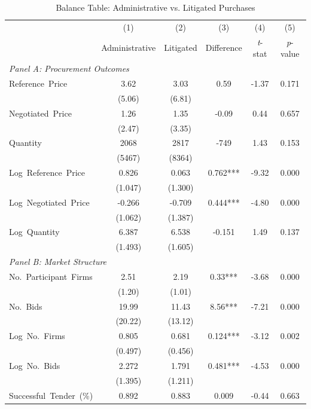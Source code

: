 \begin{table}[ht]
  \centering
  \caption{Balance Table: Administrative vs. Litigated Purchases}
  \label{tab:balance}
  \small
  \begin{threeparttable}
  \begin{tabular}{lccccc}
    \hline\hline
    & (1) & (2) & (3) & (4) & (5) \\
    & Administrative & Litigated & Difference & \textit{t}-stat & \textit{p}-value \\
    \hline
    \multicolumn{6}{l}{\textit{Panel A: Procurement Outcomes}} \\[3pt]
    Reference~Price & 3.62 & 3.03 & 0.59 & -1.37 & 0.171 \\
    & (5.06) & (6.81) & & & \\[3pt]
    Negotiated~Price & 1.26 & 1.35 & -0.09 & 0.44 & 0.657 \\
    & (2.47) & (3.35) & & & \\[3pt]
    Quantity & 2068 & 2817 & -749 & 1.43 & 0.153 \\
    & (5467) & (8364) & & & \\[3pt]
    Log~Reference~Price & 0.826 & 0.063 & 0.762*** & -9.32 & 0.000 \\
    & (1.047) & (1.300) & & & \\[3pt]
    Log~Negotiated~Price & -0.266 & -0.709 & 0.444*** & -4.80 & 0.000 \\
    & (1.062) & (1.387) & & & \\[3pt]
    Log~Quantity & 6.387 & 6.538 & -0.151 & 1.49 & 0.137 \\
    & (1.493) & (1.605) & & & \\[3pt]
    \hline
    \multicolumn{6}{l}{\textit{Panel B: Market Structure}} \\[3pt]
    No.~Participant~Firms & 2.51 & 2.19 & 0.33*** & -3.68 & 0.000 \\
    & (1.20) & (1.01) & & & \\[3pt]
    No.~Bids & 19.99 & 11.43 & 8.56*** & -7.21 & 0.000 \\
    & (20.22) & (13.12) & & & \\[3pt]
    Log~No.~Firms & 0.805 & 0.681 & 0.124*** & -3.12 & 0.002 \\
    & (0.497) & (0.456) & & & \\[3pt]
    Log~No.~Bids & 2.272 & 1.791 & 0.481*** & -4.53 & 0.000 \\
    & (1.395) & (1.211) & & & \\[3pt]
    Successful~Tender~(\%) & 0.892 & 0.883 & 0.009 & -0.44 & 0.663 \\

\end{tabular}
\end{threeparttable}
\end{table}
